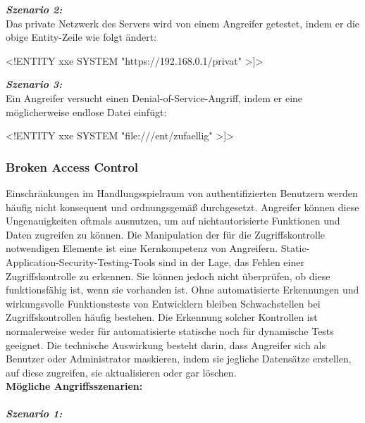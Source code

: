\textbf{\textit{Szenario 2:}}\\
Das private Netzwerk des Servers wird von einem Angreifer getestet, indem er die obige Entity-Zeile wie folgt ändert\cite[10]{owasp17top10}:\\

\begin{LaTeXCode}[caption={XML-Beispiel 2},captionpos=b, label=LaTeXCode:xxe2][numbers=none]
<!ENTITY xxe SYSTEM "https://192.168.0.1/privat" >]>
\end{LaTeXCode}

\textbf{\textit{Szenario 3:}}\\
Ein Angreifer versucht einen Denial-of-Service-Angriff, indem er eine möglicherweise endlose Datei einfügt\cite[10]{owasp17top10}:\\

\begin{LaTeXCode}[caption={XML-Beispiel 3},captionpos=b, label=LaTeXCode:xxe3][numbers=none]
<!ENTITY xxe SYSTEM "file:///ent/zufaellig" >]>
\end{LaTeXCode}

\subsubsection{Broken Access Control}

Einschränkungen im Handlungsspielraum von authentifizierten Benutzern werden häufig nicht konsequent und ordnungsgemäß durchgesetzt. Angreifer können diese Ungenauigkeiten oftmals ausnutzen, um auf nichtautorisierte Funktionen und Daten zugreifen zu können. Die Manipulation der für die Zugriffskontrolle notwendigen Elemente ist eine Kernkompetenz von Angreifern. Static-Application-Security-Testing-Tools sind in der Lage, das Fehlen einer Zugriffskontrolle zu erkennen. Sie können jedoch nicht überprüfen, ob diese funktionsfähig ist, wenn sie vorhanden ist. Ohne automatisierte Erkennungen und wirkungsvolle Funktionstests von Entwicklern bleiben Schwachstellen bei Zugriffskontrollen häufig bestehen. Die Erkennung solcher Kontrollen ist normalerweise weder für automatisierte statische noch für dynamische Tests geeignet. Die technische Auswirkung besteht darin, dass Angreifer sich als Benutzer oder Administrator maskieren, indem sie jegliche Datensätze erstellen, auf diese zugreifen, sie aktualisieren oder gar löschen\cite[11]{owasp17top10}.\\

\textbf{Mögliche Angriffsszenarien:}\\
\\
\textbf{\textit{Szenario 1:}}\\

